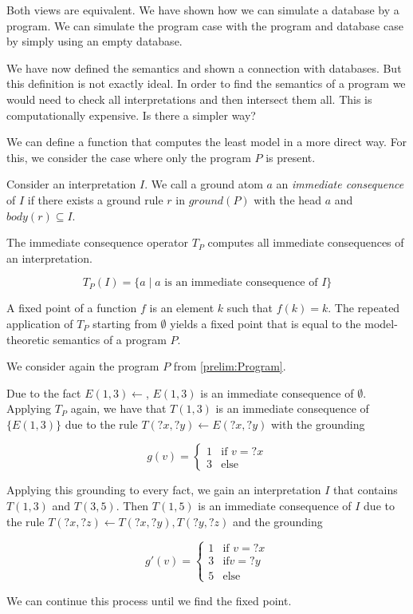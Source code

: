 Both views are equivalent. We have shown how we can simulate a database by a program. We can simulate the program case with the program and database case by simply using an empty database.

We have now defined the semantics and shown a connection with databases. But this definition is not exactly ideal. In order to find the semantics of a program we would need to check all interpretations and then intersect them all. This is computationally expensive. Is there a simpler way?

We can define a function that computes the least model in a more direct way. For this, we consider the case where only the program $P$ is present.

Consider an interpretation $I$. We call a ground atom $a$ an \textit{immediate consequence} of $I$ if there exists a ground rule $r$ in $ground(P)$ with the head $a$ and $body(r) \subseteq I$.

The immediate consequence operator $T_P$ computes all immediate consequences of an interpretation. 

\[T_P(I) = \{ a \mid \text {$a$ is an immediate consequence of $I$}\} \]

A fixed point of a function $f$ is an element $k$ such that $f(k) = k$. The repeated application of $T_P$ starting from $\emptyset$ yields a fixed point that is equal to the model-theoretic semantics of a program $P$. 

\begin{contexample}
    We consider again the program $P$ from \cref{prelim:Program}. 

    Due to the fact $E(1,3) \leftarrow$, $E(1,3)$ is an immediate consequence of $\emptyset$. Applying $T_P$ again, we have that $T(1,3)$ is an immediate consequence of $\{E(1,3)\}$ due to the rule $T(?x,?y) \leftarrow E(?x, ?y)$ with the grounding 
    
    \[
    g(v) =
    \begin{cases}
        1 & \text{if } v = ?x \\
        3 & \text{else}
    \end{cases}
    \]

    Applying this grounding to every fact, we gain an interpretation $I$ that contains $T(1,3)$ and $T(3,5)$. Then $T(1,5)$ is an immediate consequence of $I$ due to the rule $T(?x, ?z) \leftarrow T(?x,?y), T(?y, ?z)$ and the grounding 

    \[
    g'(v) =
    \begin{cases}
        1 & \text{if } v = ?x \\
        3 & \text{if} v = ?y \\
        5 & \text{else}
    \end{cases}
    \]

    We can continue this process until we find the fixed point.
\end{contexample}

